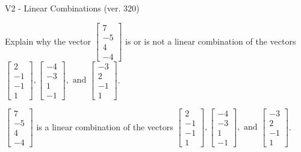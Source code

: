 \begin{exercise}
  \begin{exerciseTitle}V2 - Linear Combinations (ver. 320)\end{exerciseTitle}
  \begin{exerciseStatement}
    Explain why the vector \(\left[\begin{array}{c}
7 \\
-5 \\
4 \\
-4
\end{array}\right]\)  is or is not a linear 
	combination of the vectors \(\left[\begin{array}{c}
2 \\
-1 \\
-1 \\
1
\end{array}\right] , \left[\begin{array}{c}
-4 \\
-3 \\
1 \\
-1
\end{array}\right] , \text{ and } \left[\begin{array}{c}
-3 \\
2 \\
-1 \\
1
\end{array}\right]\).
	


  \end{exerciseStatement}
  \begin{exerciseAnswer}
   \(\left[\begin{array}{c}
7 \\
-5 \\
4 \\
-4
\end{array}\right]\) 
  	 is  
	a linear combination of the vectors \(\left[\begin{array}{c}
2 \\
-1 \\
-1 \\
1
\end{array}\right] , \left[\begin{array}{c}
-4 \\
-3 \\
1 \\
-1
\end{array}\right] , \text{ and } \left[\begin{array}{c}
-3 \\
2 \\
-1 \\
1
\end{array}\right]\).

	
  


  \end{exerciseAnswer}
\end{exercise}